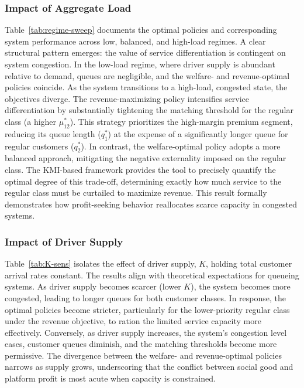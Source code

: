 \subsubsection{Impact of Aggregate Load}
Table~\ref{tab:regime-sweep} documents the optimal policies and corresponding system performance across low, balanced, and high-load regimes.
A clear structural pattern emerges: the value of service differentiation is contingent on system congestion.
In the low-load regime, where driver supply is abundant relative to demand, queues are negligible, and the welfare- and revenue-optimal policies coincide.
As the system transitions to a high-load, congested state, the objectives diverge.
The revenue-maximizing policy intensifies service differentiation by substantially tightening the matching threshold for the regular class (a higher $\mu_{12}^*$).
This strategy prioritizes the high-margin premium segment, reducing its queue length ($q_1^*$) at the expense of a significantly longer queue for regular customers ($q_2^*$).
In contrast, the welfare-optimal policy adopts a more balanced approach, mitigating the negative externality imposed on the regular class.
The KMI-based framework provides the tool to precisely quantify the optimal degree of this trade-off, determining exactly how much service to the regular class must be curtailed to maximize revenue.
This result formally demonstrates how profit-seeking behavior reallocates scarce capacity in congested systems.



\subsubsection{Impact of Driver Supply}
Table~\ref{tab:K-sens} isolates the effect of driver supply, $K$, holding total customer arrival rates constant.
The results align with theoretical expectations for queueing systems.
As driver supply becomes scarcer (lower $K$), the system becomes more congested, leading to longer queues for both customer classes.
In response, the optimal policies become stricter, particularly for the lower-priority regular class under the revenue objective, to ration the limited service capacity more effectively.
Conversely, as driver supply increases, the system's congestion level eases, customer queues diminish, and the matching thresholds become more permissive.
The divergence between the welfare- and revenue-optimal policies narrows as supply grows, underscoring that the conflict between social good and platform profit is most acute when capacity is constrained.

